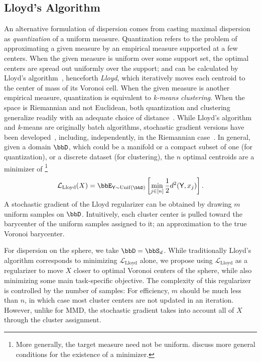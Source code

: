 \documentclass[10pt]{article} %
\newcommand\var[1]{\textsf{#1}}
\begin{document}
\subsection{Lloyd's Algorithm}
An alternative formulation of dispersion comes from casting maximal dispersion as
\emph{quantization} of a uniform measure. Quantization refers to the problem of
approximating a given measure by an empirical measure supported at a few
centers. When the given measure is uniform over some support set,
the optimal centers are spread out uniformly over the support;
and can be calculated by Lloyd's algorithm~\citep{lloyd1982},
henceforth \emph{Lloyd}, which iteratively moves each centroid to the center of mass of its Voronoi cell.
When the given measure is another empirical measure, quantization is equivalent
to \emph{k-means clustering}.
When the space is Riemannian and not Euclidean, both quantization and clustering
generalize readily with an adequate choice of distance~\citep{lebrigant2019quantization}.
While Lloyd's algorithm and \emph{k}-means are originally batch algorithms,
stochastic gradient versions have been developed~\citep{bottou-bengio-95,sculley2010web},
including, independently, in the Riemannian case~\citep{lebrigant2019quantization}.
In general, given a domain \(\bbD\), which could be a manifold or
a compact subset of one (for
quantization), or a discrete dataset (for clustering), the
\(n\) optimal centroids are a minimizer of
\footnote{More generally, the target measure need not be uniform.
\citet{lebrigant2019quantization} discuss more general conditions for the
existence of a minimizer.}
\begin{equation}
    \mathcal{L}_{\text{Lloyd}}(X) = \bbE_{\var{Y} \sim \operatorname{Unif}(\bbD)}
\left[ \min_{j \in [n]} \frac{1}{2} d^2(\var{Y}, x_j)\right].
\end{equation}
A stochastic gradient of the Lloyd regularizer can be obtained by drawing \(m\) uniform samples on \(\bbD\). Intuitively, each cluster center is pulled toward the barycenter of
the uniform samples assigned to it; an approximation to the true Voronoi
barycenter.

For dispersion on the sphere, we take \(\bbD=\bbS_d\).
While traditionally Lloyd's algorithm
corresponds to minimizing \(\mathcal{L}_{\text{Lloyd}}\) alone,
we propose using \(\mathcal{L}_{\text{Lloyd}}\) as a regularizer to move \(X\) closer to
optimal Voronoi centers of the sphere, while also minimizing some main
task-specific objective.
The complexity of this regularizer is controlled by the number of samples:
For efficiency, \(m\) should be much less than \(n\),
in which case most cluster centers are not updated in an iteration.
However, unlike for MMD, the stochastic gradient takes into
account all of \(X\) through the cluster assignment.
\end{document}
